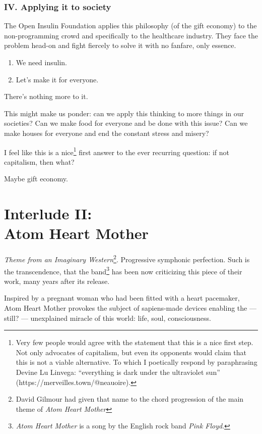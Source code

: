 \subsection{IV. Applying it to society}

The Open Insulin Foundation applies this philosophy (of the gift economy) to the non-programming crowd and specifically to the healthcare industry. They face the problem head-on and fight fiercely to solve it with no fanfare, only essence.

\begin{enumerate}
    \item{We need insulin.}
    \item{Let’s make it for everyone.}
\end{enumerate}

There’s nothing more to it.

This might make us ponder: can we apply this thinking to more things in our societies? Can we make food for everyone and be done with this issue? Can we make houses for everyone and end the constant stress and misery?

I feel like this is a nice\footnote{Very few people would agree with the statement that this is a nice first step. Not only advocates of capitalism, but even its opponents would claim that this is not a viable alternative. To which I poetically respond by paraphrasing Devine Lu Linvega: “everything is dark under the ultraviolet sun” (https://merveilles.town/@neauoire).} first answer to the ever recurring question: if not capitalism, then what?

Maybe gift economy.

\chapter*{Interlude II:\\Atom Heart Mother}

\emph{Theme from an Imaginary Western}\footnote{David Gilmour had given that name to the chord progression of the main theme of \emph{Atom Heart Mother}}. Progressive symphonic perfection. Such is the transcendence, that the band\footnote{\emph{Atom Heart Mother} is a song by the English rock band \emph{Pink Floyd}.} has been now criticizing this piece of their work, many years after its release.

Inspired by a pregnant woman who had been fitted with a heart pacemaker, Atom Heart Mother provokes the subject of sapiens-made devices enabling the — still? — unexplained miracle of this world: life, soul, consciousness.

